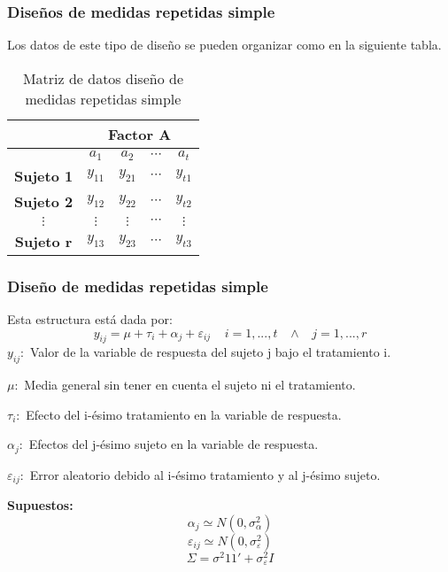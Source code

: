 \documentclass[12pt]{beamer}
\begin{document}
\begin{frame}
\frametitle{Diseños de medidas repetidas simple}
Los datos de este tipo de diseño se pueden organizar como en la siguiente tabla.
\begin{table}[htbp]
  \centering
    \begin{tabular}{|c|c|c|c|c|}
\cline{2-5}    \multicolumn{1}{r|}{} & \multicolumn{4}{c|}{\textbf{Factor A}} \\
    \hline
          & \textbf{$a_1$} & \textbf{$a_2$} & $\cdots$ & \textbf{$a_t$} \\
    \hline
    \textbf{Sujeto 1} & $y_{11}$ & $y_{21}$ & $\cdots$ & $y_{t1}$ \\
    
    \textbf{Sujeto 2} & $y_{12}$ & $y_{22}$ & $\cdots$ & $y_{t2}$ \\
    
    $\vdots$ & $\vdots$ & $\vdots$ & $\cdots$ & $\vdots$ \\
    
    \textbf{Sujeto r} & $y_{13}$ & $y_{23}$ & $\cdots$ & $y_{t3}$ \\
    \hline
    \end{tabular}%
\caption{Matriz de datos diseño de medidas repetidas simple}  
  \label{tab:addlabel}%
\end{table}%

\end{frame}

\begin{frame}
\frametitle{Diseño de medidas repetidas simple}
Esta estructura está dada por:
$$y_{ij}=\mu+\tau_i+\alpha_j+\varepsilon_{ij} \;\;\;\; i=1,...,t \;\;\;  \wedge \;\;\; j=1,...,r$$
$y_{ij}:$ Valor de la variable de respuesta del sujeto j bajo el tratamiento i.

$\mu:$ Media general sin tener en cuenta el sujeto ni el tratamiento.

$\tau_i:$ Efecto del i-ésimo tratamiento en la variable de respuesta.

$\alpha_j:$ Efectos del j-ésimo sujeto en la variable de respuesta.

$\varepsilon_{ij}:$ Error aleatorio debido al i-ésimo tratamiento y al j-ésimo sujeto.

\textbf{Supuestos:} 
$$\alpha_j \simeq N(0,\sigma^2_\alpha)$$
$$\varepsilon_{ij} \simeq N(0,\sigma^2_\varepsilon)$$
$$\Sigma =\sigma^2 11' + \sigma^2_\varepsilon I$$
\end{frame}
\end{document}
